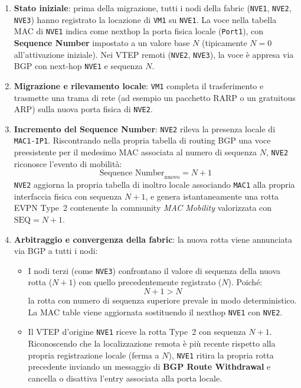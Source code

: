 \documentclass[11pt, a4paper]{article}
\begin{document}
\begin{enumerate}
    \item \textbf{Stato iniziale}: prima della migrazione, tutti i nodi della fabric (\texttt{NVE1}, \texttt{NVE2}, \texttt{NVE3}) hanno registrato la locazione di \texttt{VM1} su \texttt{NVE1}. La voce nella tabella MAC di \texttt{NVE1} indica come nexthop la porta fisica locale (\texttt{Port1}), con \textbf{Sequence Number} impostato a un valore base $N$ (tipicamente $N=0$ all'attivazione iniziale). Nei VTEP remoti (\texttt{NVE2}, \texttt{NVE3}), la voce è appresa via BGP con next-hop \texttt{NVE1} e sequenza $N$.
    \item \textbf{Migrazione e rilevamento locale}: \texttt{VM1} completa il trasferimento e trasmette una trama di rete (ad esempio un pacchetto RARP o un gratuitous ARP) sulla nuova porta fisica di \texttt{NVE2}.
    \item \textbf{Incremento del Sequence Number}: \texttt{NVE2} rileva la presenza locale di \texttt{MAC1-IP1}. Riscontrando nella propria tabella di routing BGP una voce preesistente per il medesimo MAC associata al numero di sequenza $N$, \texttt{NVE2} riconosce l'evento di mobilità:
    \[
    \text{Sequence Number}_{\text{nuovo}} = N + 1
    \]
    \texttt{NVE2} aggiorna la propria tabella di inoltro locale associando \texttt{MAC1} alla propria interfaccia fisica con sequenza $N+1$, e genera istantaneamente una rotta EVPN Type~2 contenente la community \emph{MAC Mobility} valorizzata con $\text{SEQ} = N + 1$.
    \item \textbf{Arbitraggio e convergenza della fabric}: la nuova rotta viene annunciata via BGP a tutti i nodi:
    \begin{itemize}[noitemsep]
        \item I nodi terzi (come \texttt{NVE3}) confrontano il valore di sequenza della nuova rotta ($N+1$) con quello precedentemente registrato ($N$). Poiché:
        \[
        N + 1 > N
        \]
        la rotta con numero di sequenza superiore prevale in modo deterministico. La MAC table viene aggiornata sostituendo il nexthop \texttt{NVE1} con \texttt{NVE2}.
        \item Il VTEP d'origine \texttt{NVE1} riceve la rotta Type~2 con sequenza $N+1$. Riconoscendo che la localizzazione remota è più recente rispetto alla propria registrazione locale (ferma a $N$), \texttt{NVE1} ritira la propria rotta precedente inviando un messaggio di \textbf{BGP Route Withdrawal} e cancella o disattiva l'entry associata alla porta locale.
    \end{itemize}
\end{enumerate}
\end{document}
